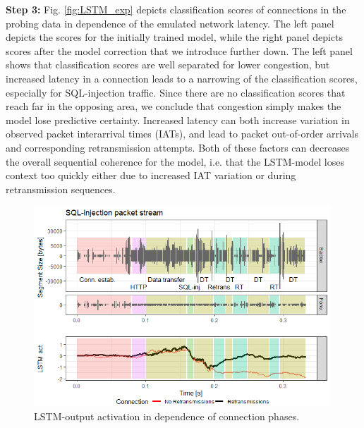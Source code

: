 \documentclass[runningheads]{llncs}
\begin{document}
\textbf{Step 3:} Fig. \ref{fig:LSTM_exp} depicts classification scores of connections in the probing data in dependence of the emulated network latency. The left panel depicts the scores for the initially trained model, while the right panel depicts scores after the model correction that we introduce further down. 
The left panel shows that classification scores are well separated for lower congestion, but increased latency in a connection leads to a narrowing of the classification scores, especially for SQL-injection traffic. Since there are no classification scores that reach far in the opposing area, we conclude that congestion simply makes the model lose predictive certainty. 
Increased latency can both increase variation in observed packet interarrival times (IATs), and lead to packet out-of-order arrivals and corresponding retransmission attempts. Both of these factors can decreases the overall sequential coherence for the model, i.e. that the LSTM-model loses context too quickly either due to increased IAT variation or during retransmission sequences. 


\begin{figure}
\centering
\includegraphics[width=0.99\textwidth]{images/LSTM_activation_new.png}
\caption{LSTM-output activation in dependence of connection phases.}\label{fig:LSTM_act}
\end{figure}
\end{document}

